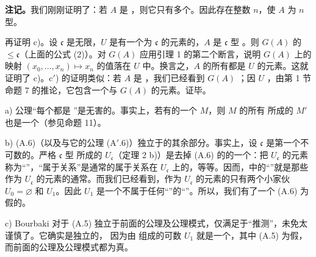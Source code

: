 \textbf{注记。}我们刚刚证明了：若 $A$ 是 ，则它只有多个。因此存在整数 $n$，使 $A$ 为 $n$ 型。

再证明 c)。设 $\mathfrak{c}$ 是无限，$U$ 是有一个为 $\mathfrak{c}$ 的元素的，$A$ 是 $\mathfrak{c}$ 型 。则 $G(A)$ 的 $\leq\mathfrak{c}$（上面的公式 (2)）。对 $G(A)$ 应用引理 1 的第二个断言，说明 $G(A)$ 上的映射 $(x_0,\ldots,x_n)\mapsto x_n$ 的值落在 $U$ 中。换言之，$A$ 的所有都是 $U$ 的元素。这就证明了 c)。c$'$) 的证明类似：若 $A$ 是 ，我们已经看到 $G(A)$ ；因 $U$ ，由第 1 节命题 7 的推论，它包含一个与 $G(A)$ 的元素。证毕。

a) 公理“每个都是 ”是无害的。事实上，若有的一个 $M$，则 $M$ 的所有 所成的 $M'$ 也是一个（参见命题 11）。

b)  (A.6)（以及与它的公理 (A$'$.6)）独立于的其余部分。事实上，设 $\mathfrak{c}$ 是第一个不可数的。严格 $\mathfrak{c}$ 型 所成的 $U_{\mathfrak{c}}$（定理 2 b)）是去掉 (A.6) 的的一个：把 $U_{\mathfrak{c}}$ 的元素称为“”，“属于关系”是通常的属于关系在 $U_{\mathfrak{c}}$ 上的，等等。因而，中的“”就是那些作为 $U_{\mathfrak{c}}$ 的元素的通常。而我们已经看到，作为 $U_{\mathfrak{c}}$ 的元素的只有两个小家伙 $U_0=\varnothing$ 和 $U_1$。因此 $U_1$ 是一个不属于任何“”的“”。所以，我们有了一个 (A.6) 为假的。

c) Bourbaki 对于 (A.5) 独立于前面的公理及公理模式，仅满足于“推测”，未免太谨慎了。它确实是独立的，
因为由 组成的可数 $U_1$ 就是一个，其中 (A.5) 为假，而前面的公理及公理模式都为真。

